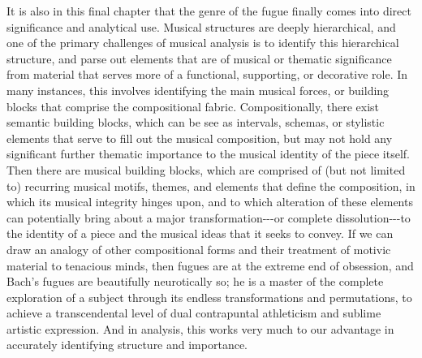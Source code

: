 It is also in this final chapter that the genre of the fugue finally
comes into direct significance and analytical use. Musical structures
are deeply hierarchical, and one of the primary challenges of musical
analysis is to identify this hierarchical structure, and parse out
elements that are of musical or thematic significance from material that
serves more of a functional, supporting, or decorative role. In many
instances, this involves identifying the main musical forces, or
building blocks that comprise the compositional fabric. Compositionally,
there exist semantic building blocks, which can be see as intervals,
schemas, or stylistic elements that serve to fill out the musical
composition, but may not hold any significant further thematic
importance to the musical identity of the piece itself. Then there are
musical building blocks, which are comprised of (but not limited to)
recurring musical motifs, themes, and elements that define the
composition, in which its musical integrity hinges upon, and to which
alteration of these elements can potentially bring about a major
transformation-\/-\/-or complete dissolution-\/-\/-to the identity of a
piece and the musical ideas that it seeks to convey. If we can draw an
analogy of other compositional forms and their treatment of motivic
material to tenacious minds, then fugues are at the extreme end of
obsession, and Bach's fugues are beautifully neurotically so; he is a
master of the complete exploration of a subject through its endless
transformations and permutations, to achieve a transcendental level of
dual contrapuntal athleticism and sublime artistic expression. And in
analysis, this works very much to our advantage in accurately
identifying structure and importance.


